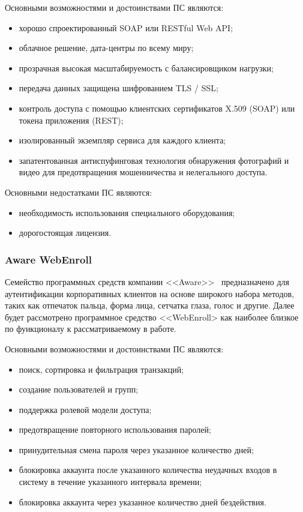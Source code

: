 Основными возможностями и достоинствами ПС являются:
\begin{itemize}
  \item хорошо спроектированный SOAP или RESTful Web API;
  \item облачное решение, дата-центры по всему миру;
  \item прозрачная высокая масштабируемость с балансировщиком нагрузки;
  \item передача данных защищена шифрованием TLS / SSL;
  \item контроль доступа с помощью клиентских сертификатов X.509 (SOAP) или токена приложения (REST);
  \item изолированный экземпляр сервиса для каждого клиента;
  \item запатентованная антиспуфинговая технология обнаружения фотографий и видео для предотвращения мошенничества и нелегального доступа.
\end{itemize}

Основными недостатками ПС являются:
\begin{itemize}
  \item необходимость использования специального оборудования;
  \item дорогостоящая лицензия.
\end{itemize}

\subsubsection{Aware WebEnroll}
\label{sub:domain:analogs:aware}
Семейство программных средств компании <<Aware>>~\cite{analogs_aware} предназначено для аутентификации корпоративных клиентов на основе широкого набора методов, таких как отпечаток пальца, форма лица, сетчатка глаза, голос и другие. Далее будет рассмотрено программное средство <<WebEnroll> как наиболее близкое по функционалу к рассматриваемому в работе.

Основными возможностями и достоинствами ПС являются:
\begin{itemize}
    \item поиск, сортировка и фильтрация транзакций;
    \item создание пользователей и групп;
    \item поддержка ролевой модели доступа;
    \item предотвращение повторного использования паролей;
    \item принудительная смена пароля через указанное количество дней;
    \item блокировка аккаунта после указанного количества неудачных входов в систему в течение указанного интервала времени;
    \item блокировка аккаунта через указанное количество дней бездействия.
\end{itemize}

